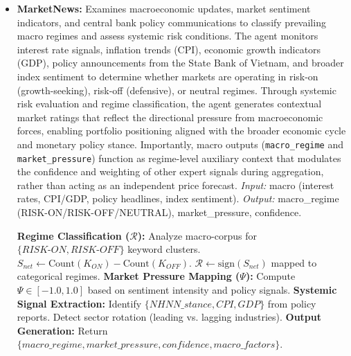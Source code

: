 \documentclass{ieeeaccess}
\begin{document}
\begin{itemize}
    \item \textbf{MarketNews:} 
    Examines macroeconomic updates, market sentiment indicators, and central bank policy communications to classify prevailing macro regimes and assess systemic risk conditions. The agent monitors interest rate signals, inflation trends (CPI), economic growth indicators (GDP), policy announcements from the State Bank of Vietnam, and broader index sentiment to determine whether markets are operating in risk-on (growth-seeking), risk-off (defensive), or neutral regimes. Through systemic risk evaluation and regime classification, the agent generates contextual market ratings that reflect the directional pressure from macroeconomic forces, enabling portfolio positioning aligned with the broader economic cycle and monetary policy stance.  
    Importantly, macro outputs (\texttt{macro\_regime} and \texttt{market\_pressure}) function as regime-level auxiliary context that modulates the confidence and weighting of other expert signals during aggregation, rather than acting as an independent price forecast.
    \textit{Input:} macro (interest rates, CPI/GDP, policy headlines, index sentiment).  
    \textit{Output:} macro\_regime (RISK-ON/RISK-OFF/NEUTRAL), market\_pressure, confidence.

    \begin{algorithm}[H]
    \caption{MarketNews macro regime classification}
    \begin{algorithmic}[1]
    \STATE \textbf{Regime Classification ($\mathcal{R}$):}
    \STATE \quad Analyze macro-corpus for $\{RISK\text{-}ON, RISK\text{-}OFF\}$ keyword clusters.
    \STATE \quad $S_{net} \gets \text{Count}(K_{ON}) - \text{Count}(K_{OFF})$.
    \STATE \quad $\mathcal{R} \gets \text{sign}(S_{net})$ mapped to categorical regimes.
    \STATE \textbf{Market Pressure Mapping ($\Psi$):}
    \STATE \quad Compute $\Psi \in [-1.0, 1.0]$ based on sentiment intensity and policy signals.
    \STATE \textbf{Systemic Signal Extraction:}
    \STATE \quad Identify $\{NHNN\_stance, CPI, GDP\}$ from policy reports.
    \STATE \quad Detect sector rotation (leading vs. lagging industries).
    \STATE \textbf{Output Generation:}
    \STATE \quad Return $\{macro\_regime, market\_pressure, confidence, macro\_factors\}$.
    \end{algorithmic}
    \end{algorithm}


\end{itemize}
\end{document}
